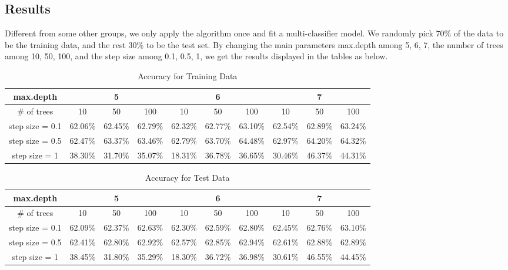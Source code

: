 \documentclass{article}
\begin{document}
\begin{spacing}{1}
\begin{large}
\subsection{Results}

\noindent \indent Different from some other groups, we only apply the algorithm once and fit a multi-classifier model. We randomly pick 70\% of the data to be the training data, and the rest 30\% to be the test set. By changing the main parameters \cite{xg3} max.depth among 5, 6, 7, the number of trees among 10, 50, 100, and the step size among 0.1, 0.5, 1, we get the results displayed in the tables as below.
\begin{table}[h]
\centering
\caption{Accuracy for Training Data}
\label{Accuracy for Training Data}
\begin{tabular}{cccccccccc}
\hline
max.depth       & \multicolumn{3}{c}{5} & \multicolumn{3}{c}{6} & \multicolumn{3}{c}{7} \\ \hline
\# of trees     & 10    & 50    & 100   & 10  & 50       & 100  & 10    & 50    & 100   \\
step size = 0.1 & 62.06\%    & 62.45\%     & 62.79\%     & 62.32\%    & 62.77\%         & 63.10\%      & 62.54\%     & 62.89\%      & 63.24\%      \\
step size = 0.5 & 62.47\%    & 63.37\%       & 63.46\%      & 62.79\%   & 63.70\%  & 64.48\%     & 62.97\%       & 64.20\%      & 64.32\%      \\
step size = 1   &38.30\%       & 31.70\%      &35.07\%       &18.31\%     & 36.78\%         &36.65\%      &30.46\%       &46.37\%       &44.31\%       \\ \hline
\end{tabular}
\end{table}

\begin{table}[h]
\centering
\caption{Accuracy for Test Data}
\label{Accuracy for Test Data}
\begin{tabular}{cccccccccc}
\hline
max.depth       & \multicolumn{3}{c}{5} & \multicolumn{3}{c}{6} & \multicolumn{3}{c}{7} \\ \hline
\# of trees     & 10    & 50    & 100   & 10  & 50       & 100  & 10    & 50    & 100   \\
step size = 0.1 & 62.09\%      & 62.37\%     & 62.63\%      &62.30\%     & 62.59\%       & 62.80\%      & 62.45\%      & 62.76\%      & 63.10\%      \\
step size = 0.5 & 62.41\%     & 62.80\%     & 62.92\%      & 62.57\%    &62.85\%     & 62.94\%   & 62.61\%      & 62.88\%      & 62.89\%      \\
step size = 1   &38.45\%       & 31.80\%      & 35.29\%      &18.30\%     & 36.72\%         &  36.98\% &30.61\%       &46.55\%      &44.45\%     \\ \hline
\end{tabular}
\end{table}


\end{large}
\end{spacing}
\end{document}
